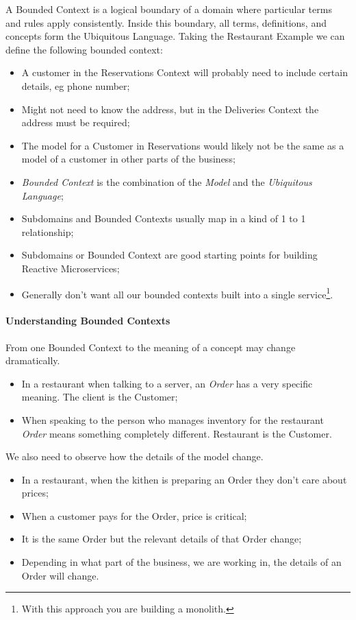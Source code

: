 A Bounded Context is a logical boundary of a domain where particular terms and rules apply consistently. Inside this boundary, all terms, definitions, and concepts form the Ubiquitous Language. Taking the Restaurant Example we can define the following bounded context:
\begin{itemize}
    \item A customer in the Reservations Context will probably need to include certain details, eg phone number;
    \item Might not need to know the address, but in the Deliveries Context the address must be required;
    \item The model for a Customer in Reservations would likely not be the same as a model of a customer in other parts of the business;
    \item \emph{Bounded Context} is the combination of the \emph{Model} and the \emph{Ubiquitous Language};
    \item Subdomains and Bounded Contexts usually map in a kind of 1 to 1 relationship;
    \item Subdomains or Bounded Context are good starting points for building Reactive Microservices;
    \item Generally don't want all our bounded contexts built into a single service\footnote{With this approach you are building a monolith.}. 
\end{itemize}

\paragraph{Understanding Bounded Contexts}

From one Bounded Context to the meaning of a concept may change dramatically.
\begin{itemize}
    \item In a restaurant when talking to a server, an \emph{Order} has a very specific meaning. The client is the Customer;
    \item When speaking to the person who manages inventory for the restaurant \emph{Order} means something completely different. Restaurant is the Customer.
\end{itemize}

We also need to observe how the details of the model change.
\begin{itemize}
    \item In a restaurant, when the kithen is preparing an Order they don't care about prices;
    \item When a customer pays for the Order, price is critical;
    \item It is the same Order but the relevant details of that Order change;
    \item Depending in what part of the business, we are working in, the details of an Order will change.
\end{itemize}

